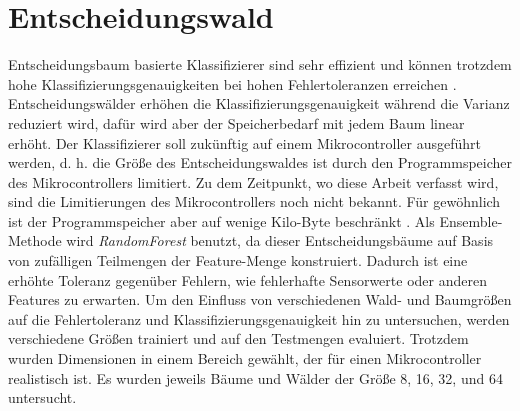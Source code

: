 \section{Entscheidungswald}
\label{sec:model_dt}
Entscheidungsbaum basierte Klassifizierer sind sehr effizient und können trotzdem hohe Klassifizierungsgenauigkeiten bei hohen Fehlertoleranzen erreichen \cite{dymelThesis}.
Entscheidungswälder erhöhen die Klassifizierungsgenauigkeit während die Varianz reduziert wird, dafür wird aber der Speicherbedarf mit jedem Baum linear erhöht.
Der Klassifizierer soll zukünftig auf einem Mikrocontroller ausgeführt werden, d. h. die Größe des Entscheidungswaldes ist durch den Programmspeicher des Mikrocontrollers limitiert.
Zu dem Zeitpunkt, wo diese Arbeit verfasst wird, sind die Limitierungen des Mikrocontrollers noch nicht bekannt.
Für gewöhnlich ist der Programmspeicher aber auf wenige Kilo-Byte beschränkt \cite{dymelThesis}.
\newline
\newline
Als Ensemble-Methode wird \textit{RandomForest} benutzt, da dieser Entscheidungsbäume auf Basis von zufälligen Teilmengen der Feature-Menge konstruiert.
Dadurch ist eine erhöhte Toleranz gegenüber Fehlern, wie fehlerhafte Sensorwerte oder anderen Features zu erwarten.
\newpage
Um den Einfluss von verschiedenen Wald- und Baumgrößen auf die Fehlertoleranz und Klassifizierungsgenauigkeit hin zu untersuchen, werden verschiedene Größen
trainiert und auf den Testmengen evaluiert. Trotzdem wurden Dimensionen in einem Bereich gewählt, der für einen Mikrocontroller realistisch ist.
Es wurden jeweils Bäume und Wälder der Größe 8, 16, 32, und 64 untersucht.